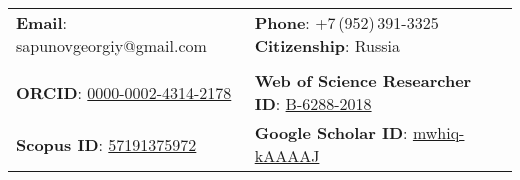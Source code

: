 \documentclass[letterpaper, 11pt]{article}
\begin{document}
	
	
	
	\vspace{0.5cm}
	\begin{center}
		\begin{tabular}{lll}
			\textbf{Email}: sapunovgeorgiy@gmail.com      &
			\textbf{Phone}: +7\,(952)\,391-3325
			\hspace{0.4in} \textbf{Citizenship}: Russia \\

            \\

			\textbf{ORCID}: \href{https://orcid.org/0000-0002-4314-2178}{0000-0002-4314-2178}    &
            \textbf{Web of Science Researcher ID}: \href{https://www.webofscience.com/wos/author/record/B-6288-2018}{B-6288-2018}    \\
            \textbf{Scopus ID}: \href{https://www.scopus.com/authid/detail.uri?authorId=57191375972}{57191375972}    &
            \textbf{Google Scholar ID}: \href{https://orcid.org/0000-0002-4314-2178}{mwhiq-kAAAAJ}
			
		\end{tabular}
	\end{center}
	
	
	\setlength{\tabcolsep}{8pt}
	
\end{document}

